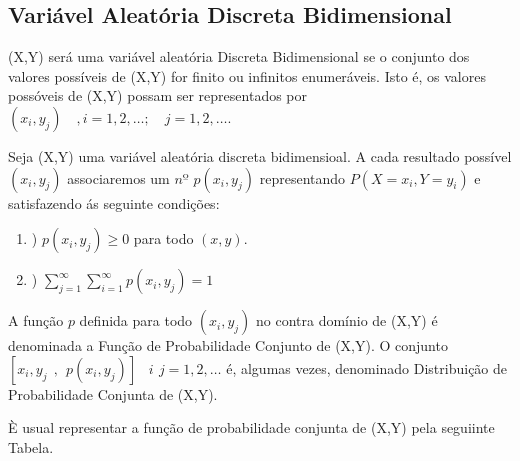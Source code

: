 \documentclass[a4paper,12pt]{report}
\begin{document}
{\subsection{Variável Aleatória Discreta Bidimensional}

(X,Y) será uma variável aleatória Discreta Bidimensional se o
conjunto dos valores possíveis de (X,Y) for finito ou infinitos
enumeráveis. Isto é, os valores possóveis de (X,Y) possam ser
representados por $(x_{i}, y_{j}) \quad, i= 1, 2, \ldots ; \quad j
= 1, 2, \ldots $.\vskip0.3cm

Seja (X,Y) uma variável aleatória discreta bidimensioal. A cada
resultado  possível $(x_{i},y_{j})$ associaremos um $nº$ $p(x_{i},
y_{j})$ representando $P(X = x_{i} , Y = y_{i} )$ e satisfazendo
ás seguinte condições:

\begin{enumerate}
 \item ) $ p(x_{i}, y_{j}) \geq 0 $ para todo $(x,y)$.
 \item ) $ \sum^{\infty}_{j=1}\sum^{\infty}_{i=1} p(x_{i}, y_{j}) = 1 $
 \end{enumerate}

\par A função $p$ definida para todo $(x_{i}, y_{j})$ no contra
domínio de (X,Y) é denominada a Função de Probabilidade Conjunto
de (X,Y). O conjunto $ [ x_{i}, y_{j} \ \ , \ \ p(x_{i}, y_{j}) ]
\ \, \ \ i  \, \  j = 1, 2, \ldots $ é, algumas vezes, denominado
Distribuição de Probabilidade Conjunta de (X,Y).\vskip0.3cm

È usual representar a função de probabilidade conjunta de (X,Y)
pela seguiinte Tabela.

\begin{table}[!htb]
\end{table}


}
\end{document}
